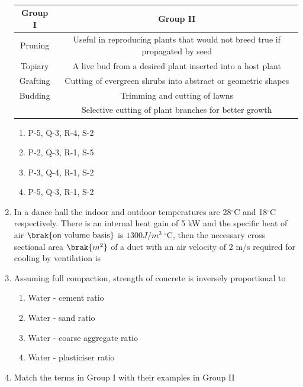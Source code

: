 \documentclass[journal,12pt,onecolumn]{IEEEtran}
\theoremstyle{remark}
\begin{document}
\begin{enumerate}
\begin{table}[H]
\centering
\begin{tabular}{c|c}
Group I & Group II \\
\hline
Pruning & Useful in reproducing plants that would not breed true if propagated by seed \\
Topiary & A live bud from a desired plant inserted into a host plant \\
Grafting & Cutting of evergreen shrubs into abstract or geometric shapes \\
Budding & Trimming and cutting of lawns \\
 & Selective cutting of plant branches for better growth \\
\end{tabular}
\caption*{}
\label{Q.44}
\end{table}

\hfill{}
\begin{enumerate}
\item P-5, Q-3, R-4, S-2 
\item P-2, Q-3, R-1, S-5
\item P-3, Q-4, R-1, S-2
\item P-5, Q-3, R-1, S-2
\end{enumerate}

\item In a dance hall the indoor and outdoor temperatures are 28$^\circ$C and 18$^\circ$C respectively. There is an internal heat gain of 5 kW and the specific heat of air $\brak{\text{on volume basis}}$ is $1300 J/m^3~^\circ$C, then the necessary cross sectional area $\brak{m^2}$ of a duct with an air velocity of 2 m/s required for cooling by ventilation is \underline{\hspace{4cm}}

\hfill{}

\item Assuming full compaction, strength of concrete is inversely proportional to

\hfill{}
\begin{enumerate}
\item Water - cement ratio
\item Water - sand ratio
\item Water - coarse aggregate ratio
\item Water - plasticiser ratio
\end{enumerate}

\item Match the terms in Group I with their examples in Group II


\end{enumerate}
\end{document}
